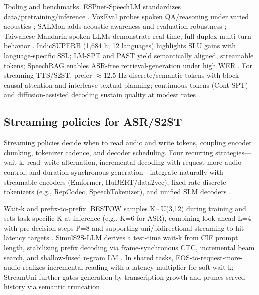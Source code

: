 \documentclass{article}
\begin{document}
Tooling and benchmarks. ESPnet-SpeechLM standardizes data/pretraining/inference \cite{tian2025espnetspeechlmopenspeechlanguagemodeltoo}. VoxEval probes spoken QA/reasoning under varied acoustics \cite{cui2025voxevalbenchmarkingknowledgeunderstandin}; SALMon adds acoustic awareness and evaluation robustness \cite{maimon2025salmonsuiteacousticlanguagemodelevaluati}; Taiwanese Mandarin spoken LLMs demonstrate real-time, full-duplex multi-turn behavior \cite{yang2024buildingtaiwanesemandarinspokenlanguagem}. IndicSUPERB (1,684 h; 12 languages) highlights SLU gains with language-specific SSL; LM-SPT and PAST yield semantically aligned, streamable tokens; SpeechRAG enables ASR-free retrieval-generation under high WER \cite{entry2025indicsuperbspeechprocessinguniversalperf,jo2025lmsptalignedsemanticdistillationspeechto,har-tuv2025pastphoneticacousticspeechtokenizer,min2025speechretrievalaugmentedgenerationwithou}. For streaming TTS/S2ST, prefer $\approx$12.5 Hz discrete/semantic tokens with block-causal attention and interleave textual planning; continuous tokens (Cont-SPT) and diffusion-assisted decoding sustain quality at modest rates \cite{li2025continuousspeechtokenizertext,bai2025dmelspeechtokenizationmadesimple,zhao2024textlessstreamingspeechtranslationsemant,yang2025diffsoundstreamefficientspeechtokenizati}.



\subsection{Streaming policies for ASR/S2ST} \label{subsec:Streaming policies for ASR/S2ST}

Streaming policies decide when to read audio and write tokens, coupling encoder chunking, tokenizer cadence, and decoder scheduling. Four recurring strategies---wait-k, read--write alternation, incremental decoding with request-more-audio control, and duration-synchronous generation---integrate naturally with streamable encoders (Emformer, HuBERT/data2vec), fixed-rate discrete tokenizers (e.g., RepCodec, SpeechTokenizer), and unified SLM decoders \cite{huang2024repcodecspeechrepresentationcodectokeniz,zhang2024speechtokenizerunifiedspeechtokenizerlar}.

Wait-k and prefix-to-prefix. BESTOW samples K$\sim$U(3,12) during training and sets task-specific K at inference (e.g., K=6 for ASR), combining look-ahead L=4 with pre-decision steps P=8 and supporting uni/bidirectional streaming to hit latency targets \cite{chen2024bestowefficientstreamablespeechlanguagem}. SimulS2S-LLM derives a test-time wait-k from CIF prompt length, stabilizing prefix decoding via frame-synchronous CTC, incremental beam search, and shallow-fused n-gram LM \cite{deng2025simuls2sllmunlockingsimultaneousinferenc}. In shared tasks, EOS-to-request-more-audio realizes incremental reading with a latency multiplier for soft wait-k; StreamUni further gates generation by transcription growth and prunes served history via semantic truncation \cite{ouyang2025cmusiwslt2025simultaneousspeechtranslati,guo2025streamuniachievingstreamingspeechtransla}.
\end{document}
